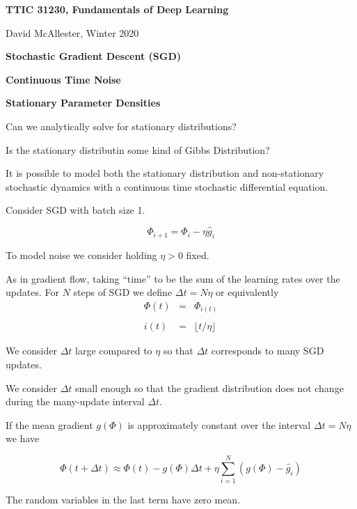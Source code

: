 




{\Huge
  \centerline{\bf TTIC 31230, Fundamentals of Deep Learning}
  \bigskip
  \centerline{David McAllester, Winter 2020}
  \vfill
  \centerline{\bf Stochastic Gradient Descent (SGD)}
  \vfill
  \centerline{\bf Continuous Time Noise}
  \vfill
  \centerline{\bf Stationary Parameter Densities}
  \vfill
  \vfill
  \vfill


Can we analytically solve for stationary distributions?

\vfill
Is the stationary distributin some kind of Gibbs Distribution?

\vfill
It is possible to model both the stationary distribution and non-stationary stochastic dynamics
with a {\color{red} continuous time} stochastic differential equation.



\vfill
Consider SGD with batch size 1.

$$\Phi_{i+1} = \Phi_i - \eta\hat{g}_i$$

\vfill
To model noise we consider holding $\eta > 0$ fixed.

\vfill
As in gradient flow, taking ``time'' to be the sum of the learning rates over the updates.
For $N$ steps of SGD we define $\Delta t = N \eta$ or equivalently
\begin{eqnarray*}
\Phi(t) & = & \Phi_{i(t)} \\
\\
i(t) & = & \lfloor t/\eta \rfloor
\end{eqnarray*}





\vfill
We consider $\Delta t$ large compared to $\eta$ so that $\Delta t$ corresponds to many SGD updates.

\vfill
We consider $\Delta t$ small enough so that the gradient distribution does not change during the many-update interval $\Delta t$.


If the mean gradient $g(\Phi)$ is approximately constant over the interval $\Delta t = N \eta$ we have

$$\Phi(t + \Delta t)  \approx \Phi(t) -g(\Phi)\Delta t + \eta \sum_{i=1}^N (g(\Phi) - \hat{g}_i)$$

\vfill
The random variables in the last term have zero mean.

}
